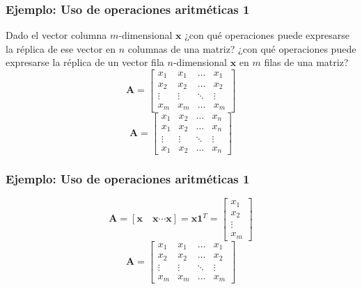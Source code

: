 \documentclass{beamer}
\begin{document}
\begin{frame}
\frametitle{Ejemplo: Uso de operaciones aritméticas 1}
Dado el vector columna $m$-dimensional $\boldsymbol{x}$ ¿con qué operaciones puede expresarse la réplica de ese vector en $n$ columnas de una matriz? ¿con qué operaciones puede expresarse la réplica de un vector fila $n$-dimensional $\boldsymbol{x}$ en $m$ filas de una matriz?
\begin{equation*}
\boldsymbol{A} = \begin{bmatrix} x_{1}  &  x_{1} & \dots & x_{1}\\ x_{2} &  x_{2} & \dots & x_{2} \\ \vdots &  \vdots & \ddots & \vdots \\ x_{m} &  x_{m} & \dots & x_{m} \end{bmatrix}
\end{equation*}
\begin{equation*}
\boldsymbol{A} = \begin{bmatrix} x_{1}  &  x_{2} & \dots & x_{n}\\ x_{1} &  x_{2} & \dots & x_{n} \\ \vdots &  \vdots & \ddots & \vdots \\ x_{1} &  x_{2} & \dots & x_{n} \end{bmatrix}
\end{equation*}

\end{frame}
\begin{frame}
\frametitle{Ejemplo: Uso de operaciones aritméticas 1}
\begin{equation*}
\boldsymbol{A}= \left[ \boldsymbol{x} \hspace{1em} \boldsymbol{x}  \cdots \boldsymbol{x}  \right]= \boldsymbol{x} \boldsymbol{1}^T=\begin{bmatrix}  x_{1}   \\ x_{2} \\ \vdots  \\ x_{m}  \end{bmatrix}
\end{equation*}
\begin{equation*}
\boldsymbol{A} = \begin{bmatrix} x_{1}  &  x_{1} & \dots & x_{1}\\ x_{2} &  x_{2} & \dots & x_{2} \\ \vdots &  \vdots & \ddots & \vdots \\ x_{m} &  x_{m} & \dots & x_{m} \end{bmatrix}
\end{equation*}
\end{frame}
\end{document}
